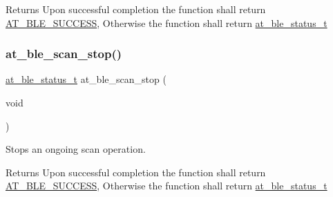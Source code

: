 \begin{DoxyReturn}{Returns}
Upon successful completion the function shall return \mbox{\hyperlink{group__error__codes__group_gga3b1db9b95feb157b3c188ca27fe76988a7e3bfff5387331cd4f2c56cbcbbd7e19}{A\+T\+\_\+\+B\+L\+E\+\_\+\+S\+U\+C\+C\+E\+SS}}, Otherwise the function shall return \mbox{\hyperlink{at__ble__api_8h_ace24eb4e5ca3f325c663b809da5feb92}{at\+\_\+ble\+\_\+status\+\_\+t}} 
\end{DoxyReturn}
\mbox{\label{group__gap__scan__group_gae7efc689bfa835b6870bd304726cb56f}} 
\subsubsection{\texorpdfstring{at\_ble\_scan\_stop()}{at\_ble\_scan\_stop()}}
{\footnotesize\ttfamily \mbox{\hyperlink{group__error__codes__group_ga3b1db9b95feb157b3c188ca27fe76988}{at\+\_\+ble\+\_\+status\+\_\+t}} at\+\_\+ble\+\_\+scan\+\_\+stop (\begin{DoxyParamCaption}\item[{void}]{ }\end{DoxyParamCaption})}



Stops an ongoing scan operation. 

\begin{DoxyReturn}{Returns}
Upon successful completion the function shall return \mbox{\hyperlink{group__error__codes__group_gga3b1db9b95feb157b3c188ca27fe76988a7e3bfff5387331cd4f2c56cbcbbd7e19}{A\+T\+\_\+\+B\+L\+E\+\_\+\+S\+U\+C\+C\+E\+SS}}, Otherwise the function shall return \mbox{\hyperlink{at__ble__api_8h_ace24eb4e5ca3f325c663b809da5feb92}{at\+\_\+ble\+\_\+status\+\_\+t}} 
\end{DoxyReturn}
